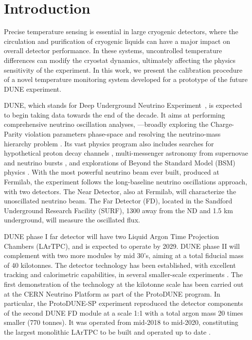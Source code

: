 \section{Introduction}
\label{sec:introduction}

\noindent Precise temperature sensing is essential in large cryogenic detectors, where the circulation and purification of cryogenic liquids can have a major impact on overall detector performance. In these systems, uncontrolled temperature differences can modify the cryostat dynamics, ultimately affecting the physics sensitivity of the experiment. In this work, we present the calibration procedure of a novel temperature monitoring system developed for a prototype of the future DUNE experiment. 

DUNE, which stands for Deep Underground Neutrino Experiment~\cite{dune_tdr1}, is expected to begin taking data towards the end of the decade. It aims at performing comprehensive neutrino oscillation analyses, ---broadly exploring the Charge-Parity violation parameters phase-space and resolving the neutrino-mass hierarchy problem \cite{bib:dune_osc}. Its vast physics program also includes searches for hypothetical proton decay channels \cite{bib:dune_tdr2}, multi-messenger astronomy from supernovae and neutrino bursts \cite{bib:dune_supernova}, and explorations of Beyond the Standard Model (BSM) physics \cite{bib:dune_bsm}. With the most powerful neutrino beam ever built, produced at Fermilab, the experiment follows the long-baseline neutrino oscillations approach, with two detectors. The Near Detector, also at Fermilab, will characterize the unoscillated neutrino beam. The Far Detector (FD), located in the Sandford Underground Research Facility (SURF), 1300 away from the ND and 1.5 km underground, will measure the oscillated flux.

DUNE phase I far detector will have two Liquid Argon Time Projection Chambers (LArTPC), and is expected to operate by 2029. DUNE phase II will complement with two more modules by mid 30's, aiming at a total fiducial mass of 40 kilotonnes. The detector technology has been established, with excellent tracking and calorimetric capabilities, in several smaller-scale experiments \cite{icarus,microboone}. The first demonstration of the technology at the kilotonne scale has been carried out at the CERN Neutrino Platform as part of the ProtoDUNE program. In particular, the ProtoDUNE-SP experiment \cite{pdsp_tdr} reproduced the detector components of the second DUNE FD module \cite{dune_tdr4} at a scale 1:1 with a total argon mass 20 times smaller (770 tonnes). It was operated from mid-2018 to mid-2020, constituting the largest monolithic LArTPC to be built and operated up to date \cite{pdsp_1,pdsp_2}.

